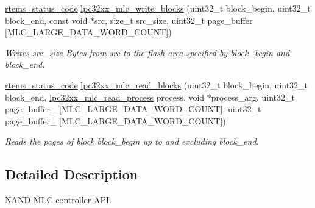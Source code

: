 \begin{DoxyCompactItemize}
\mbox{\hyperlink{group__ClassicStatus_ga545d41846817eaba6143d52ee4d9e9fe}{rtems\+\_\+status\+\_\+code}} \mbox{\hyperlink{group__lpc32xx__nand__mlc_gafa7ec91e1dfa52e3bcc614f4a9a66ab2}{lpc32xx\+\_\+mlc\+\_\+write\+\_\+blocks}} (uint32\+\_\+t block\+\_\+begin, uint32\+\_\+t block\+\_\+end, const void $\ast$src, size\+\_\+t src\+\_\+size, uint32\+\_\+t page\+\_\+buffer \mbox{[}M\+L\+C\+\_\+\+L\+A\+R\+G\+E\+\_\+\+D\+A\+T\+A\+\_\+\+W\+O\+R\+D\+\_\+\+C\+O\+U\+NT\mbox{]})
\begin{DoxyCompactList}\small\item\em Writes {\itshape src\+\_\+size} Bytes from {\itshape src} to the flash area specified by {\itshape block\+\_\+begin} and {\itshape block\+\_\+end}. \end{DoxyCompactList}\item 
\mbox{\hyperlink{group__ClassicStatus_ga545d41846817eaba6143d52ee4d9e9fe}{rtems\+\_\+status\+\_\+code}} \mbox{\hyperlink{group__lpc32xx__nand__mlc_ga2d5f41c8abd5910ad853e7ba096c9f7b}{lpc32xx\+\_\+mlc\+\_\+read\+\_\+blocks}} (uint32\+\_\+t block\+\_\+begin, uint32\+\_\+t block\+\_\+end, \mbox{\hyperlink{group__lpc32xx__nand__mlc_ga8adf1c46b26e07838b729a78d83332ee}{lpc32xx\+\_\+mlc\+\_\+read\+\_\+process}} process, void $\ast$process\+\_\+arg, uint32\+\_\+t page\+\_\+buffer\+\_ \mbox{[}M\+L\+C\+\_\+\+L\+A\+R\+G\+E\+\_\+\+D\+A\+T\+A\+\_\+\+W\+O\+R\+D\+\_\+\+C\+O\+U\+NT\mbox{]}, uint32\+\_\+t page\+\_\+buffer\+\_ \mbox{[}M\+L\+C\+\_\+\+L\+A\+R\+G\+E\+\_\+\+D\+A\+T\+A\+\_\+\+W\+O\+R\+D\+\_\+\+C\+O\+U\+NT\mbox{]})
\begin{DoxyCompactList}\small\item\em Reads the pages of block {\itshape block\+\_\+begin} up to and excluding {\itshape block\+\_\+end}. \end{DoxyCompactList}\end{DoxyCompactItemize}


\subsection{Detailed Description}
N\+A\+ND M\+LC controller A\+PI. 

